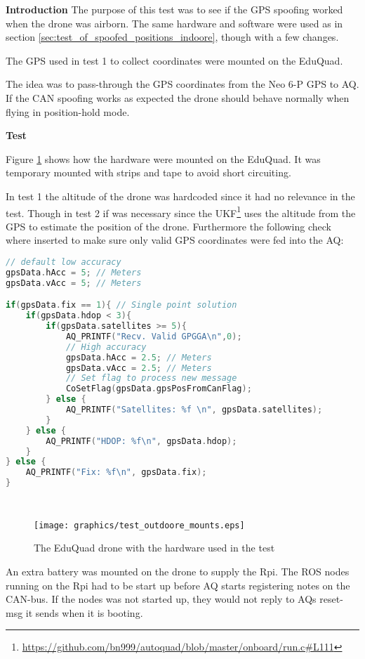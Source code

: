 \textbf{Introduction}
The purpose of this test was to see if the GPS spoofing worked when the drone was airborn. The same hardware and software were used as in section \ref{sec:test_of_spoofed_positions_indoore}, though with a few changes.

The GPS used in test 1 to collect coordinates were mounted on the EduQuad.

The idea was to pass-through the GPS coordinates from the Neo 6-P GPS to AQ. If the CAN spoofing works as expected the drone should behave normally when flying in position-hold mode.

\textbf{Test}

Figure \ref{fig:eduquad_bottom_up} shows how the hardware were mounted on the EduQuad. It was temporary mounted with strips and tape to avoid short circuiting.  

In test 1 the altitude of the drone was hardcoded since it had no relevance  in the test. Though in test 2 if was necessary since the UKF\footnote{\url{https://github.com/bn999/autoquad/blob/master/onboard/run.c\#L111}} uses the altitude from the GPS to estimate the position of the drone. Furthermore the following check where inserted to make sure only valid GPS coordinates were fed into the AQ:
\begin{center}

\begin{minipage}{\textwidth}
		\begin{lstlisting}[language = c++, caption = Quality checks added to discard bad positions, label=code:pseudo_tx]
// default low accuracy
gpsData.hAcc = 5; // Meters
gpsData.vAcc = 5; // Meters

if(gpsData.fix == 1){ // Single point solution
	if(gpsData.hdop < 3){
		if(gpsData.satellites >= 5){
			AQ_PRINTF("Recv. Valid GPGGA\n",0);
			// High accuracy
			gpsData.hAcc = 2.5; // Meters
			gpsData.vAcc = 2.5; // Meters
			// Set flag to process new message
			CoSetFlag(gpsData.gpsPosFromCanFlag);
        } else {
			AQ_PRINTF("Satellites: %f \n", gpsData.satellites);       
        }
    } else {
	    AQ_PRINTF("HDOP: %f\n", gpsData.hdop);    	
    }
} else {
	AQ_PRINTF("Fix: %f\n", gpsData.fix);
}
		\end{lstlisting}
\end{minipage}

\lstinline|        |
\end{center}

\begin{figure}[H]
    \center
    \texttt{[image: graphics/test\_outdoore\_mounts.eps]}
  \caption{The EduQuad drone with the hardware used in the test}
    \label{fig:eduquad_bottom_up}
\end{figure}
An extra battery was mounted on the drone to supply the Rpi. The ROS nodes running on the Rpi had to be start up before AQ starts registering notes on the CAN-bus. If the nodes was not started up, they would not reply to AQs reset-msg it sends when it is booting. 


